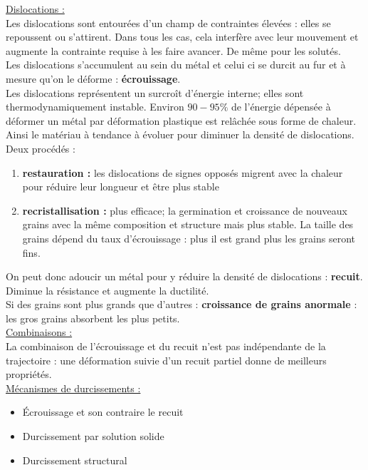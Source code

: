 \documentclass[../main.tex]{subfiles}
\begin{document}
\quad \underline{Dislocations :}\\
Les dislocations sont entourées d'un champ de contraintes élevées : elles se repoussent ou s'attirent. Dans tous les cas, cela interfère avec leur mouvement et augmente la contrainte requise à les faire avancer. De même pour les solutés.\\

Les dislocations s'accumulent au sein du métal et celui ci se durcit au fur et à mesure qu'on le déforme : \textbf{écrouissage}.\\
Les dislocations représentent un surcroît d'énergie interne; elles sont thermodynamiquement instable. Environ $90-95\%$ de l'énergie dépensée à déformer un métal par déformation plastique est relâchée sous forme de chaleur.\\
Ainsi le matériau à tendance à évoluer pour diminuer la densité de dislocations.\\

Deux procédés : \begin{enumerate}
    \item \textbf{restauration :} les dislocations de signes opposés migrent avec la chaleur pour réduire leur longueur et être plus stable\\
    \item \textbf{recristallisation :} plus efficace; la germination et croissance de nouveaux grains avec la même composition et structure mais plus stable. La taille des grains dépend du taux d'écrouissage : plus il est grand plus les grains seront fins.\\
\end{enumerate}

On peut donc adoucir un métal pour y réduire la densité de dislocations : \textbf{recuit}. Diminue la résistance et augmente la ductilité.\\
Si des grains sont plus grands que d'autres : \textbf{croissance de grains anormale} : les gros grains absorbent les plus petits.\\

\quad \underline{Combinaisons :}\\
La combinaison de l'écrouissage et du recuit n'est pas indépendante de la trajectoire : une déformation suivie d'un recuit partiel donne de meilleurs propriétés.\\

\quad \underline{Mécanismes de durcissements :}\\
\begin{itemize}
    \item Écrouissage et son contraire le recuit\\
    \item Durcissement par solution solide\\
    \item Durcissement structural\\
\end{itemize}
\end{document}
